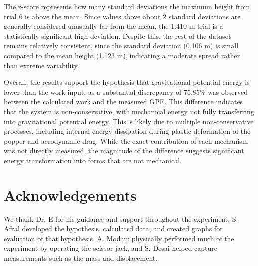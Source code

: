 \documentclass[amsmath,amssymb,aps,endfloats,linenumbers]{revtex4-2}
\begin{document}
The z-score represents how many standard deviations the maximum height from trial 6 is above the mean. Since values above about 2 standard deviations are generally considered unusually far from the mean, the 1.410 m trial is a statistically significant high deviation. Despite this, the rest of the dataset remains relatively consistent, since the standard deviation (0.106 m) is small compared to the mean height (1.123 m), indicating a moderate spread rather than extreme variability.

Overall, the results support the hypothesis that gravitational potential energy is lower than the work input, as a substantial discrepancy of 75.85\% was observed between the calculated work and the measured GPE. This difference indicates that the system is non-conservative, with mechanical energy not fully transferring into gravitational potential energy. This is likely due to multiple non-conservative processes, including internal energy dissipation during plastic deformation of the popper and aerodynamic drag. While the exact contribution of each mechanism was not directly measured, the magnitude of the difference suggests significant energy transformation into forms that are not mechanical.

\section{Acknowledgements}
We thank Dr. E for his guidance and support throughout the experiment. S. Afzal developed the hypothesis, calculated data, and created graphs for evaluation of that hypothesis. A. Modani physically performed much of the experiment by operating the scissor jack, and S. Desai helped capture measurements such as the mass and displacement.


\end{document}
